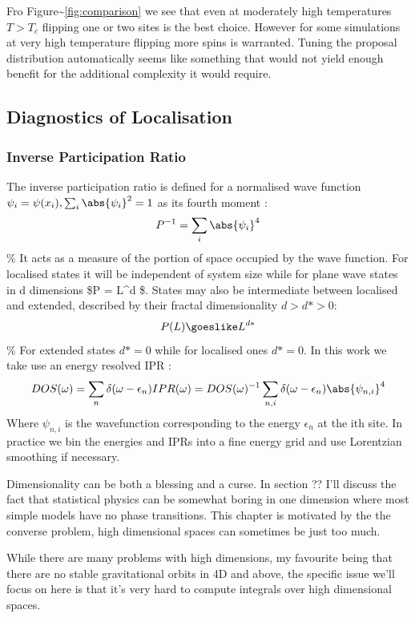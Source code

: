 Fro Figure\textasciitilde{}\ref{fig:comparison} we see that even at moderately high temperatures \(T > T_c\) flipping one or two sites is the best choice. However for some simulations at very high temperature flipping more spins is warranted. Tuning the proposal distribution automatically seems like something that would not yield enough benefit for the additional complexity it would require.

\hypertarget{diagnostics-of-localisation}{%
\subsection{Diagnostics of Localisation}\label{diagnostics-of-localisation}}

\hypertarget{inverse-participation-ratio}{%
\subsubsection{Inverse Participation Ratio}\label{inverse-participation-ratio}}

The inverse participation ratio is defined for a normalised wave function \(\psi_i = \psi(x_i), \sum_i \abs{\psi_i}^2 = 1\) as its fourth moment \autocite{kramerLocalizationTheoryExperiment1993}: \[
P^{-1} = \sum_i \abs{\psi_i}^4
\] \% It acts as a measure of the portion of space occupied by the wave function. For localised states it will be independent of system size while for plane wave states in d dimensions \$P = L\^{}d \$. States may also be intermediate between localised and extended, described by their fractal dimensionality \(d > d* > 0\): \[
P(L) \goeslike L^{d*} 
\] \% For extended states \(d* = 0\) while for localised ones \(d* = 0\). In this work we take use an energy resolved IPR \autocite{andersonAbsenceDiffusionCertain1958}: \[
DOS(\omega) = \sum_n \delta(\omega - \epsilon_n)
IPR(\omega) = DOS(\omega)^{-1} \sum_{n,i} \delta(\omega - \epsilon_n) \abs{\psi_{n,i}}^4
\] Where \(\psi_{n,i}\) is the wavefunction corresponding to the energy \(\epsilon_n\) at the ith site. In practice we bin the energies and IPRs into a fine energy grid and use Lorentzian smoothing if necessary.

Dimensionality can be both a blessing and a curse. In section ?? I'll discuss the fact that statistical physics can be somewhat boring in one dimension where most simple models have no phase transitions. This chapter is motivated by the the converse problem, high dimensional spaces can sometimes be just too much.

While there are many problems with high dimensions, my favourite being that there are no stable gravitational orbits in 4D and above, the specific issue we'll focus on here is that it's very hard to compute integrals over high dimensional spaces.

